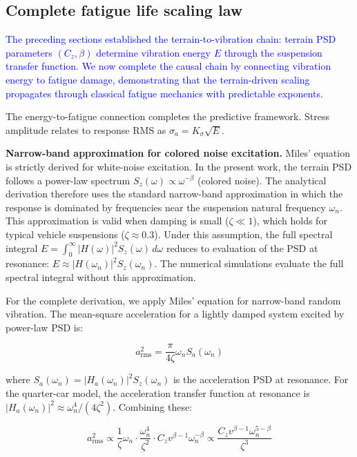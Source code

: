 \documentclass[11pt]{article}
\begin{document}
\subsection*{Complete fatigue life scaling law}

\textcolor{blue}{The preceding sections established the terrain-to-vibration chain: terrain PSD parameters $(C_z, \beta)$ determine vibration energy $E$ through the suspension transfer function. We now complete the causal chain by connecting vibration energy to fatigue damage, demonstrating that the terrain-driven scaling propagates through classical fatigue mechanics with predictable exponents.}

The energy-to-fatigue connection completes the predictive framework. Stress amplitude relates to response RMS as $\sigma_a = K_\sigma \sqrt{E}$\cite{Dowling2013,Lutes2004}. 

\textbf{Narrow-band approximation for colored noise excitation.} Miles' equation\cite{Miles1954} is strictly derived for white-noise excitation. In the present work, the terrain PSD follows a power-law spectrum $S_z(\omega) \propto \omega^{-\beta}$ (colored noise). The analytical derivation therefore uses the standard narrow-band approximation in which the response is dominated by frequencies near the suspension natural frequency $\omega_n$. This approximation is valid when damping is small ($\zeta \ll 1$), which holds for typical vehicle suspensions ($\zeta \approx 0.3$). Under this assumption, the full spectral integral $E = \int_0^\infty |H(\omega)|^2 S_z(\omega)\, d\omega$ reduces to evaluation of the PSD at resonance: $E \approx |H(\omega_n)|^2 S_z(\omega_n)$. The numerical simulations evaluate the full spectral integral without this approximation.

For the complete derivation, we apply Miles' equation for narrow-band random vibration. The mean-square acceleration for a lightly damped system excited by power-law PSD is:

\begin{equation}
a_{\text{rms}}^2 = \frac{\pi}{4\zeta} \omega_n S_a(\omega_n)
\end{equation}

where $S_a(\omega_n) = |H_a(\omega_n)|^2 S_z(\omega_n)$ is the acceleration PSD at resonance. For the quarter-car model, the acceleration transfer function at resonance is $|H_a(\omega_n)|^2 \approx \omega_n^4/(4\zeta^2)$. Combining these:

\begin{equation}
a_{\text{rms}}^2 \propto \frac{1}{\zeta} \omega_n \cdot \frac{\omega_n^4}{\zeta^2} \cdot C_z v^{\beta-1} \omega_n^{-\beta} \propto \frac{C_z v^{\beta-1} \omega_n^{5-\beta}}{\zeta^3}
\end{equation}
\end{document}
